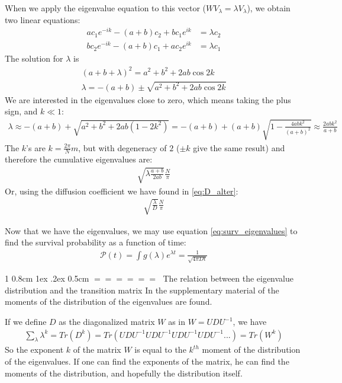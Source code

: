 \documentclass[onecolumn,fleqn,notitlepage,secnumarabic]{revtex4}
\makeatletter
\def\section{%
  \@startsection
    {section}%
    {1}%
    {\z@}%
    {0.8cm \@plus1ex \@minus .2ex}%
    {0.5cm}%
    {\Large\bf $=\!=\!=\!=\!=\!=\;$}%
}%
\makeatother
\begin{document}
When we apply the eigenvalue equation to this vector ($WV_\lambda = \lambda V_\lambda$), we obtain two linear equations:
\begin{align}
ac_1e^{-ik}   -(a+b)c_2 +bc_1e^{ik} &= \lambda c_2 \\
bc_2e^{-ik}   -(a+b)c_1 +ac_2e^{ik} &= \lambda c_1 
\end{align}
The solution for $\lambda$ is
\begin{align}
(a+b+\lambda)^2 = a^2+b^2+2ab\cos 2k \\
\lambda = -(a + b) \pm \sqrt{a^2+b^2+2ab\cos 2k}  \label{eq:abab_eigenvals}
\end{align}
We are interested in the eigenvalues close to zero, which means taking the plus sign, and $k\ll 1$:
\begin{align}
\lambda \approx -(a + b) + \sqrt{a^2+b^2+2ab(1-2k^2)} = -(a+b) +(a+b)\sqrt{1 - \frac{4abk^2}{(a+b)^2}}\approx \frac{2abk^2}{a+b}
\end{align}
The $k$'s are $k=\frac{2\pi}{N}m$, but with degeneracy of $2$ ($\pm k$ give the same result) and therefore the cumulative eigenvalues are:
\begin{align}
\sqrt{\lambda\frac{a+b}{2ab}}\frac{N}{\pi}
\end{align}
Or, using the diffusion coefficient we have found in \eqref{eq:D_alter}:
\begin{align}
\sqrt{\frac{\lambda}{D}}\frac{N}{\pi}
\end{align}

Now that we have the eigenvalues, we may use equation \ref{eq:surv_eigenvalues} to find the survival probability as a function of time:
\begin{align}
\mathcal{P}(t) =\int g(\lambda) e^{\lambda t} = \frac{1}{\sqrt{4 \pi D t}}
\end{align}



\section{The relation between the eigenvalue distribution and the transition matrix}
In the supplementary material of \cite{Amir:2010:PRL} the moments of the distribution of the eigenvalues are found. 

If we define $D$ as the diagonalized matrix $W$ as in $W=UDU^{-1}$, we have
\begin{align}\label{eq:eig_moments}
\sum_\lambda \lambda^k = Tr (D^k) = Tr(UDU^{-1}UDU^{-1}UDU^{-1}UDU^{-1}...) = Tr (W^k)
\end{align}
So the exponent $k$ of the matrix $W$ is equal to the $k^{th}$ moment of the distribution of the eigenvalues. If one can find the exponents of the matrix, he can find the moments of the distribution, and hopefully the distribution itself. 
\end{document}
